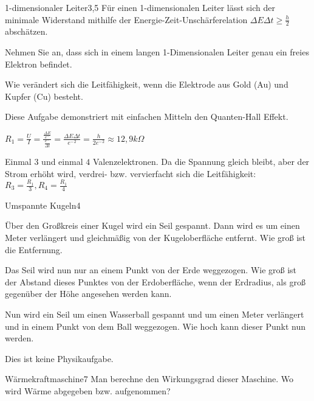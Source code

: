 \begin{problem}{1-dimensionaler Leiter}{3,5}
Für einen 1-dimensionalen Leiter lässt sich der minimale Widerstand mithilfe der Energie-Zeit-Unschärferelation $\Delta E\Delta t \geq \frac h2$ abschätzen.
\begin{abcenum}
 \item Nehmen Sie an, dass sich in einem langen 1-Dimensionalen Leiter genau ein freies Elektron befindet.
 \item Wie verändert sich die Leitfähigkeit, wenn die Elektrode aus Gold (Au) und Kupfer (Cu) besteht.
\end{abcenum}
Diese Aufgabe demonstriert mit einfachen Mitteln den Quanten-Hall Effekt.
\begin{solution}
\begin{abcenum}
  \item $R_1=\frac UI=\frac{\frac{\Delta E}{e^-}}{\frac{e^-}{\Delta t}}=\frac{\Delta E \Delta t}{{e^-}^2}=\frac{h}{2{e^-}^2}\approx 12,9\unit{k\Omega}$
  \item Einmal $3$ und einmal $4$ Valenzelektronen. Da die Spannung gleich bleibt, aber der Strom erhöht wird, verdrei- bzw. vervierfacht sich die Leitfähigkeit: $R_3=\frac {R_1}3, R_4=\frac{R_1}4$
\end{abcenum}
\end{solution}
\end{problem}

\begin{problem}{Umspannte Kugeln}{4}
\begin{abcenum}
 \item Über den Großkreis einer Kugel wird ein Seil gespannt. Dann wird es um einen Meter verlängert und gleichmäßig von der Kugeloberfläche entfernt. Wie groß ist die Entfernung.
 \item Das Seil wird nun nur an einem Punkt von der Erde weggezogen. Wie groß ist der Abstand dieses Punktes von der Erdoberfläche, wenn der Erdradius, als groß gegenüber der Höhe angesehen werden kann.
 \item Nun wird ein Seil um einen Wasserball gespannt und um einen Meter verlängert und in einem Punkt von dem Ball weggezogen. Wie hoch kann dieser Punkt nun werden.
\end{abcenum}
\begin{solution}
Dies ist keine Physikaufgabe.
\end{solution}
\end{problem}

\begin{problem}{Wärmekraftmaschine}{7}
Man berechne den Wirkungsgrad dieser Maschine. Wo wird Wärme abgegeben bzw. aufgenommen?
\end{problem}


